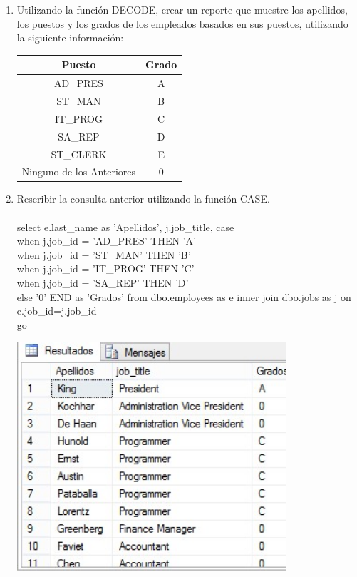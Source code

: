 \begin{enumerate}[1.]
	\item Utilizando la función DECODE, crear un reporte que muestre los apellidos, los puestos y los grados de los empleados basados en sus puestos, utilizando la siguiente información:
	\begin{center}
		\begin{tabular}{ c c }
		Puesto & Grado \\
		\hline
		AD\_PRES & A \\
		ST\_MAN & B \\
		IT\_PROG & C \\
		SA\_REP & D \\
		ST\_CLERK & E \\
		Ninguno de los Anteriores & 0 \\
		\end{tabular}
	\end{center}
	\item Rescribir la consulta anterior utilizando la función CASE.
	\\
	\\select e.last\_name as 'Apellidos', j.job\_title, case 
	\\when j.job\_id = 'AD\_PRES' THEN 'A'
	\\when j.job\_id = 'ST\_MAN' THEN 'B'
	\\when j.job\_id = 'IT\_PROG' THEN 'C'
	\\when j.job\_id = 'SA\_REP' THEN 'D'
	\\else '0' END as 'Grados' from dbo.employees as e inner join dbo.jobs as j on 
	\\e.job\_id=j.job\_id
	\\go
	\\

	\begin{center}
	\includegraphics[width=10cm]{./Imagenes/img06} 
	\end{center}
\end{enumerate}

